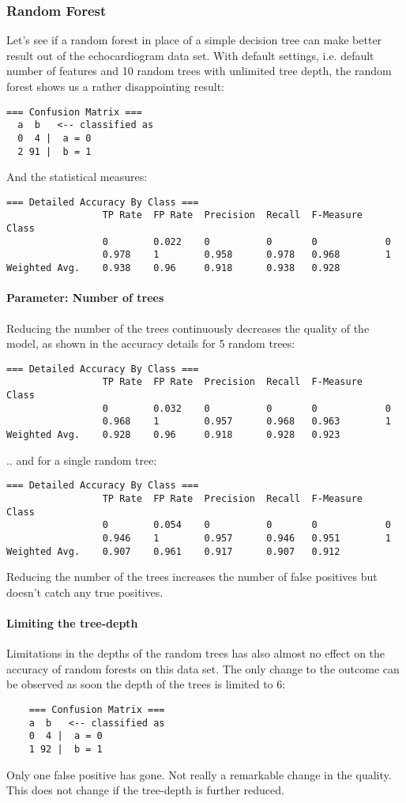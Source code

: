 \documentclass[paper=a4, fontsize=11pt]{scrartcl} %
\numberwithin{equation}{section} %
\numberwithin{figure}{section} %
\numberwithin{table}{section} %
\begin{document}
\subsubsection{Random Forest}
Let's see if a random forest in place of a simple decision tree can make better result out of the echocardiogram data set. With default settings, i.e. default number of features  and 10 random trees with unlimited tree depth, the random forest shows us a rather disappointing result:

\begin{lstlisting}
=== Confusion Matrix ===
  a  b   <-- classified as
  0  4 |  a = 0
  2 91 |  b = 1
\end{lstlisting}
And the statistical measures:
\begin{lstlisting}
=== Detailed Accuracy By Class ===
                 TP Rate  FP Rate  Precision  Recall  F-Measure    Class
                 0        0.022    0          0       0            0
                 0.978    1        0.958      0.978   0.968        1
Weighted Avg.    0.938    0.96     0.918      0.938   0.928     
\end{lstlisting}
\paragraph{Parameter: Number of trees}
Reducing the number of the trees continuously decreases the quality of the model, as shown in the accuracy details for 5 random trees:
\begin{lstlisting}
=== Detailed Accuracy By Class ===
                 TP Rate  FP Rate  Precision  Recall  F-Measure    Class
                 0        0.032    0          0       0            0  
                 0.968    1        0.957      0.968   0.963        1   
Weighted Avg.    0.928    0.96     0.918      0.928   0.923    
\end{lstlisting}
.. and for a single random tree:
\begin{lstlisting}
=== Detailed Accuracy By Class ===
                 TP Rate  FP Rate  Precision  Recall  F-Measure    Class
                 0        0.054    0          0       0            0  
                 0.946    1        0.957      0.946   0.951        1   
Weighted Avg.    0.907    0.961    0.917      0.907   0.912    
\end{lstlisting}
Reducing the number of the trees increases the number of false positives but doesn't catch any true positives.
\paragraph{Limiting the tree-depth}
Limitations in the depths of the random trees has also almost no effect on the accuracy of random forests on this data set. The only change to the outcome can be observed as soon the depth of the trees is limited to 6:
\begin{lstlisting}
    === Confusion Matrix ===
    a  b   <-- classified as
    0  4 |  a = 0
    1 92 |  b = 1
\end{lstlisting}
Only one false positive has gone. Not really a remarkable change in the quality. This does not change if the tree-depth is further reduced.
\end{document}
